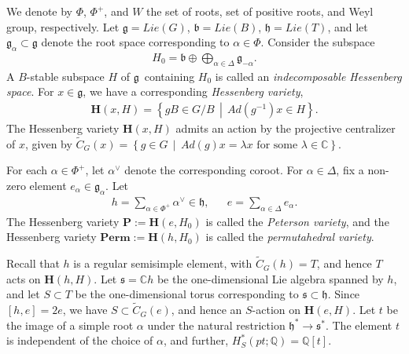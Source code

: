\documentclass[10pt]{article}
\numberwithin{thm}{section}
\theoremstyle{definition}
\theoremstyle{remark}
\newcommand{\Pet}{\ensuremath{\mathbf{P}}}
\newcommand{\Perm}{\ensuremath{\mathbf{Perm}}}
\newcommand{\Hom}{\operatorname{Hom}}
\newcommand{\bo}{\ensuremath{\mathfrak b}}
\newcommand{\g}{\ensuremath{\mathfrak g}}
\newcommand{\car}{\ensuremath{\mathfrak h}}
\newcommand{\Hess}{\mathbf H}
\newcommand{\IC}{\mathbb C}
\newcommand{\IQ}{\mathbb Q}
\newcommand{\set}[2]{\left\{#1\,\middle\vert\,#2\right\}}
\begin{document}
We denote by $\Phi$, $\Phi^+$, and $W$ the set of roots, set of positive roots, and Weyl group, respectively.
Let $\g=Lie(G)$, $\bo=Lie(B)$, $\car=Lie(T)$,
and let $\g_\alpha\subset\g$ denote the root space corresponding to $\alpha\in\Phi$.
Consider the subspace 
\begin{align*}
H_0=\bo\oplus\bigoplus_{\alpha\in\Delta}\g_{-\alpha}.
\end{align*}
A $B$-stable subspace $H$ of \g\ containing $H_0$ is called an \emph{indecomposable Hessenberg space}.
For $x\in\g$, %
we have a corresponding \emph{Hessenberg variety},
\begin{align*}
\Hess(x,H)=\set{gB\in G/B}{Ad(g^{-1})x\in H}.
\end{align*}
The Hessenberg variety $\Hess(x,H)$ admits an action by the projective centralizer of $x$,
given by $
\widetilde C_G(x)=\set{g\in G}{Ad(g)x=\lambda x\text{ for some }\lambda\in\IC}.
$

{For each $\alpha\in\Phi^+$, let $\alpha^\vee$ denote the corresponding coroot. For $\alpha\in \Delta$, fix a non-zero element $e_\alpha\in\g_\alpha$. Let}
\begin{align*}
h=\sum_{\alpha\in\Phi^+}\alpha^\vee\in\car,&&
e=\sum_{\alpha\in\Delta} e_\alpha.
\end{align*} 
The Hessenberg variety $\Pet:=\Hess(e,H_0)$ is called the \emph{Peterson variety},
and the Hessenberg variety $\Perm:=\Hess(h,H_0)$
is called the \emph{permutahedral variety}.

Recall that $h$ is a regular semisimple element, with $\widetilde C_G(h)=T$,
and hence $T$ acts on $\Hess(h,H)$.
Let $\mathfrak s=\IC h$ be the one-dimensional Lie algebra spanned by $h$,
and let $S\subset T$ be the one-dimensional torus corresponding to $\mathfrak s\subset\mathfrak h$.
Since $[h,e]=2e$, we have $S\subset \widetilde C_G(e)$,
and hence an $S$-action on $\Hess(e,H)$.
Let $t$ be the image of a simple root $\alpha$ under the natural restriction $\car^*\to\mathfrak s^*$.
The element $t$ is independent of the choice of $\alpha$,
and further, $H^*_S(pt;\IQ)=\IQ[t]$.
\end{document}
